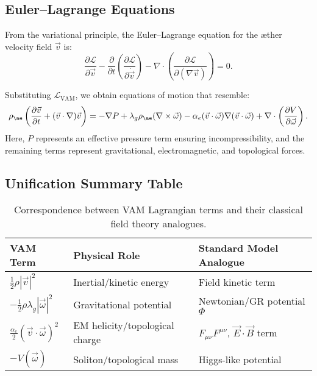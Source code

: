 \subsection{Euler--Lagrange Equations}
From the variational principle, the Euler--Lagrange equation for the \ae{}ther velocity field $\vec{v}$ is:
\begin{equation}
\frac{\partial \mathcal{L}}{\partial \vec{v}} - \frac{\partial}{\partial t} \left( \frac{\partial \mathcal{L}}{\partial \dot{\vec{v}}} \right) - \nabla \cdot \left( \frac{\partial \mathcal{L}}{\partial (\nabla \vec{v})} \right) = 0.
\end{equation}

Substituting $\mathcal{L}_{\text{VAM}}$, we obtain equations of motion that resemble:
\begin{equation}
\rho_{\ae} \left( \frac{\partial \vec{v}}{\partial t} + (\vec{v} \cdot \nabla)\vec{v} \right) = - \nabla P + \lambda_g \rho_{\ae} (\nabla \times \vec{\omega}) - \alpha_e (\vec{v} \cdot \vec{\omega}) \nabla (\vec{v} \cdot \vec{\omega}) + \nabla \cdot \left( \frac{\partial V}{\partial \vec{\omega}} \right).
\end{equation}
Here, $P$ represents an effective pressure term ensuring incompressibility, and the remaining terms represent gravitational, electromagnetic, and topological forces.

\subsection{Unification Summary Table}
\begin{table}[H]
\centering
\begin{tabular}{|l|l|l|}
\hline
\textbf{VAM Term} & \textbf{Physical Role} & \textbf{Standard Model Analogue} \\
\hline
$\frac{1}{2} \rho |\vec{v}|^2$ & Inertial/kinetic energy & Field kinetic term \\
$-\frac{1}{2} \rho \lambda_g |\vec{\omega}|^2$ & Gravitational potential & Newtonian/GR potential $\Phi$ \\
$\frac{\alpha_e}{2} (\vec{v} \cdot \vec{\omega})^2$ & EM helicity/topological charge & $F_{\mu\nu} F^{\mu\nu}$, $\vec{E}\cdot\vec{B}$ term \\
$-V(\vec{\omega})$ & Soliton/topological mass & Higgs-like potential \\
\hline
\end{tabular}
\caption{Correspondence between VAM Lagrangian terms and their classical field theory analogues.}
\end{table}


